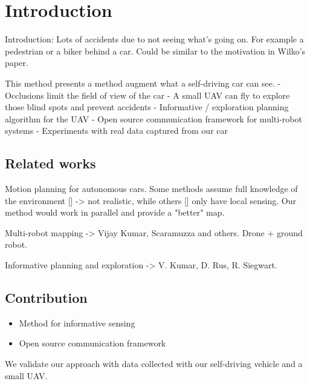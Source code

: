 
\section{Introduction}

Introduction: Lots of accidents due to not seeing what's going on. For example a pedestrian or a biker behind a car. Could be similar to the motivation in Wilko's paper.

This method presents a method augment what a self-driving car can see.
- Occlusions limit the field of view of the car
- A small UAV can fly to explore those blind spots and prevent accidents
- Informative / exploration planning algorithm for the UAV
- Open source communication framework for multi-robot systems
- Experiments with real data captured from our car 

\subsection{Related works}

Motion planning for autonomous cars. Some methods assume full knowledge of the environment [] -> not realistic, while others [] only have local sensing. Our method would work in parallel and provide a "better" map.

Multi-robot mapping -> Vijay Kumar, Scaramuzza and others. Drone + ground robot.

Informative planning and exploration -> V. Kumar, D. Rus, R. Siegwart.

\subsection{Contribution}

\begin{itemize}
\item
Method for informative sensing
\item
Open source communication framework
\end{itemize}

We validate our approach with data collected with our self-driving vehicle and a small UAV.